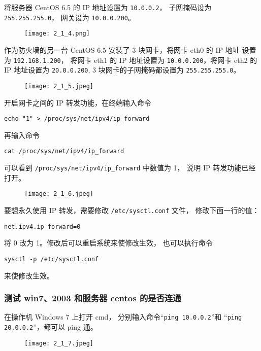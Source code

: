 将服务器 CentOS 6.5 的 IP 地址设置为 \texttt{10.0.0.2}，
子网掩码设为 \texttt{255.255.255.0}，
网关设为 \texttt{10.0.0.200}。
\begin{figure}[H]
  \begin{center}
    \texttt{[image: 2\_1\_4.png]}
  \end{center}
\end{figure}

作为防火墙的另一台 CentOS 6.5 安装了 3 块网卡，将网卡 eth0 的 IP 地址
设置为 \texttt{192.168.1.200}，
将网卡 eth1 的 IP 地址设置为 \texttt{10.0.0.200}，将网卡 eth2
的 IP 地址设置为 \texttt{20.0.0.200},
3 块网卡的子网掩码都设置为 \texttt{255.255.255.0}。
\begin{figure}[H]
  \begin{center}
    \texttt{[image: 2\_1\_5.jpeg]}
  \end{center}
\end{figure}

开启网卡之间的 IP 转发功能，在终端输入命令
\begin{verbatim}
echo "1" > /proc/sys/net/ipv4/ip_forward
\end{verbatim}
再输入命令
\begin{verbatim}
cat /proc/sys/net/ipv4/ip_forward
\end{verbatim}
可以看到 \texttt{/proc/sys/net/ipv4/ip_forward} 中数值为 1，
说明 IP 转发功能已经打开。
\begin{figure}[H]
  \begin{center}
    \texttt{[image: 2\_1\_6.jpeg]}
  \end{center}
\end{figure}

要想永久使用 IP 转发，需要修改 \texttt{/etc/sysctl.conf} 文件，
修改下面一行的值：
\begin{verbatim}
net.ipv4.ip_forward=0
\end{verbatim}
将 0 改为 1。修改后可以重启系统来使修改生效，
也可以执行命令
\begin{verbatim}
sysctl -p /etc/sysctl.conf
\end{verbatim}
来使修改生效。
%
\subsubsection{测试 win7、2003 和服务器 centos 的是否连通}
在操作机 Windows 7 上打开 cmd，
分别输入命令``\texttt{ping 10.0.0.2}''和
``\texttt{ping 20.0.0.2}''，都可以 ping 通。
\begin{figure}[H]
  \begin{center}
    \texttt{[image: 2\_1\_7.jpeg]}
  \end{center}
\end{figure}


